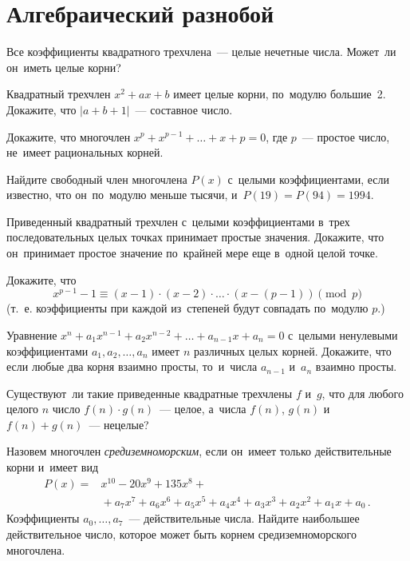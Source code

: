 
\section*{Алгебраический разнобой}


\begin{problems}

\item
Все коэффициенты квадратного трехчлена~--- целые нечетные числа.
Может~ли он~иметь целые корни?

\item
Квадратный трехчлен $x^2 + a x + b$ имеет целые корни, по~модулю большие~2.
Докажите, что $\lvert a + b + 1 \rvert$~--- составное число.

\item
Докажите, что многочлен $x^p + x^{p-1} + \ldots + x + p = 0$, где $p$~---
простое число, не~имеет рациональных корней.

\item
Найдите свободный член многочлена $P(x)$ с~целыми коэффициентами, если
известно, что он~по~модулю меньше тысячи, и~$P(19) = P(94) = 1994$.

\item
Приведенный квадратный трехчлен с~целыми коэффициентами в~трех
последовательных целых точках принимает простые значения.
Докажите, что он~принимает простое значение по~крайней мере еще в~одной
целой точке.

\item
Докажите, что
\[
    x^{p-1} - 1
\equiv
    (x - 1) \cdot (x - 2) \cdot \ldots \cdot (x - (p - 1))
\pmod{p}
\]
(т.~е. коэффициенты при каждой из~степеней будут совпадать по~модулю $p$.)

\item
Уравнение $x^n + a_1 x^{n-1} + a_2 x^{n-2} + \ldots + a_{n-1} x + a_n = 0$
с~целыми ненулевыми коэффициентами $a_1, a_2, \ldots, a_n$ имеет $n$ различных
целых корней.
Докажите, что если любые два корня взаимно просты, то~и~числа $a_{n-1}$ и~$a_n$
взаимно просты.

\item
Существуют~ли такие приведенные квадратные трехчлены $f$ и~$g$, что для любого
целого $n$ число $f(n) \cdot g(n)$~--- целое, а~числа $f(n)$, $g(n)$
и~$f(n) + g(n)$~--- нецелые?

\item
Назовем многочлен \emph{средиземноморским}, если он~имеет только действительные
корни и~имеет вид
\begin{align*}
    P(x)
={}&
    x^{10} - 20 x^9 + 135 x^8
    +\\&{}+
    a_7 x^7 + a_6 x^6 + a_5 x^5 + a_4 x^4 + a_3 x^3 + a_2 x^2 + a_1 x + a_0
\, . \end{align*}
Коэффициенты $a_0, \ldots, a_7$~--- действительные числа.
Найдите наибольшее действительное
число, которое может быть корнем средиземноморского многочлена.

\end{problems}

